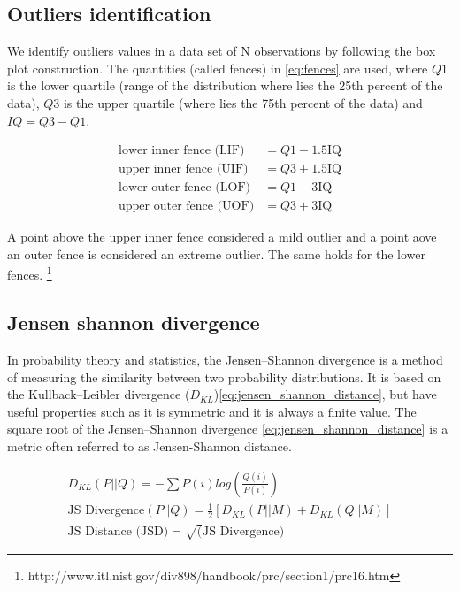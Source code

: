 \documentclass{bmcart}
\begin{document}
\begin{backmatter}
\subsection*{Outliers identification}
\label{sec:outliers_identification}

\par We identify outliers values in a data set of N observations by following the box plot construction. The quantities (called fences) in \ref{eq:fences} are used, where $Q1$ is the lower quartile (range of the distribution where lies the 25th percent of the data), $Q3$ is the upper quartile (where lies the 75th percent of the data) and $IQ = Q3 - Q1$.

\begin{equation}
\begin{split}
\text{lower inner fence (LIF)} & = Q1 - 1.5  \text{IQ} \\
\text{upper inner fence (UIF)} & = Q3 + 1.5  \text{IQ} \\
\text{lower outer fence (LOF)} & = Q1 - 3  \text{IQ} \\
\text{upper outer fence (UOF)} & = Q3 + 3  \text{IQ}
\end{split}
\label{eq:fences}
\end{equation}

\par A point above the upper inner fence considered a mild outlier and a point aove an outer fence is considered an extreme outlier. The same holds for the lower fences. \footnote{http://www.itl.nist.gov/div898/handbook/prc/section1/prc16.htm}

\subsection*{Jensen shannon divergence}

\par In probability theory and statistics, the Jensen–Shannon divergence is a method of measuring the similarity between two probability distributions. It is based on the Kullback–Leibler divergence ($D_{KL}$)\ref{eq:jensen_shannon_distance}, but have useful properties such as it is symmetric and it is always a finite value. The square root of the Jensen–Shannon divergence \ref{eq:jensen_shannon_distance} is a metric often referred to as Jensen-Shannon distance. \cite{fuglede2004jensen}

\begin{equation}
\begin{split}
D_{KL}(P||Q) = -\sum{P(i) log(\frac{Q(i)}{P(i)})} \\
\text{JS Divergence}(P||Q) = \frac{1}{2}[D_{KL}(P||M) + D_{KL}(Q||M)] \\
\text{JS Distance (JSD)} = \sqrt(\text{JS Divergence})
\end{split}
\label{eq:jensen_shannon_distance}
\end{equation}



\end{backmatter}
\end{document}
